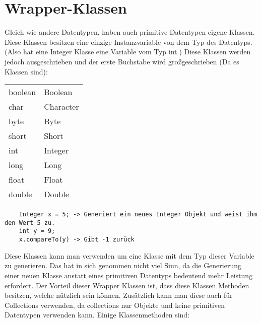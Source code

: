 \documentclass{article}
\begin{document}
	\section{Wrapper-Klassen}
	Gleich wie andere Datentypen, haben auch primitive Datentypen eigene Klassen. Diese Klassen besitzen eine einzige Instanzvariable von dem Typ des Datentyps. (Also hat eine Integer Klasse eine Variable vom Typ int.) Diese Klassen werden jedoch ausgeschrieben und der erste Buchstabe wird großgeschrieben (Da es Klassen sind): \\
		\begin{tabular}{l | l}
		boolean & Boolean \\
		char & Character \\
		byte & Byte \\
		short & Short \\
		int & Integer \\
		long & Long \\
		float & Float \\
		double & Double \\
		\end{tabular}
	\begin{verbatim}
	Integer x = 5; -> Generiert ein neues Integer Objekt und weist ihm den Wert 5 zu.
	int y = 9;
	x.compareTo(y) -> Gibt -1 zurück
	\end{verbatim}
	Diese Klassen kann man verwenden um eine Klasse mit dem Typ dieser Variable zu generieren. Das hat in sich genommen nicht viel Sinn, da die Generierung einer neuen Klasse anstatt eines primitiven Datentyps bedeutend mehr Leistung erfordert. Der Vorteil dieser Wrapper Klassen ist, dass diese Klassen Methoden besitzen, welche nützlich sein können. Zusätzlich kann man diese auch für Collections verwenden, da collections nur Objekte und keine primitiven Datentypen verwenden kann. Einige Klassenmethoden sind:
\end{document}

